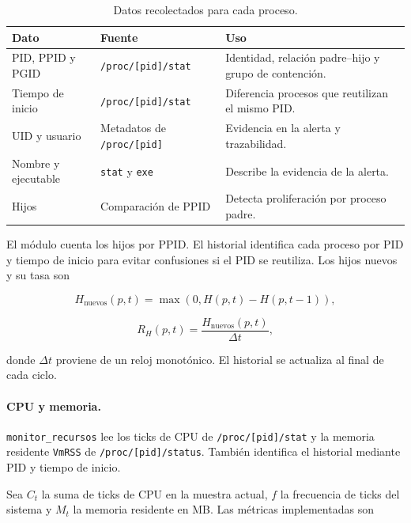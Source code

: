 \begin{table}[H]
  \centering
  \small
  \caption{Datos recolectados para cada proceso.}
  \label{tab:campos-proceso}
  \begin{tabular}{p{}p{}p{}}
    \toprule
    \textbf{Dato} & \textbf{Fuente} & \textbf{Uso} \\
    \midrule
    PID, PPID y PGID & \texttt{/proc/[pid]/stat} & Identidad, relación padre--hijo y grupo de contención. \\
    Tiempo de inicio & \texttt{/proc/[pid]/stat} & Diferencia procesos que reutilizan el mismo PID. \\
    UID y usuario & Metadatos de \texttt{/proc/[pid]} & Evidencia en la alerta y trazabilidad. \\
    Nombre y ejecutable & \texttt{stat} y \texttt{exe} & Describe la evidencia de la alerta. \\
    Hijos & Comparación de PPID & Detecta proliferación por proceso padre. \\
    \bottomrule
  \end{tabular}
\end{table}

El módulo cuenta los hijos por PPID. El historial identifica cada proceso por
PID y tiempo de inicio para evitar confusiones si el PID se reutiliza. Los hijos
nuevos y su tasa son

\begin{equation}
  H_{\mathrm{nuevos}}(p,t)=\max(0,H(p,t)-H(p,t-1)),
\end{equation}

\begin{equation}
  R_H(p,t)=\frac{H_{\mathrm{nuevos}}(p,t)}{\Delta t},
\end{equation}

donde $\Delta t$ proviene de un reloj monotónico. El historial se actualiza al
final de cada ciclo.

\paragraph{CPU y memoria.}

\texttt{monitor\_recursos} lee los ticks de CPU de
\texttt{/proc/[pid]/stat} y la memoria residente \texttt{VmRSS} de
\texttt{/proc/[pid]/status}. También identifica el historial mediante PID y
tiempo de inicio.

Sea $C_t$ la suma de ticks de CPU en la muestra actual, $f$ la frecuencia de
ticks del sistema y $M_t$ la memoria residente en MB. Las métricas implementadas
son

